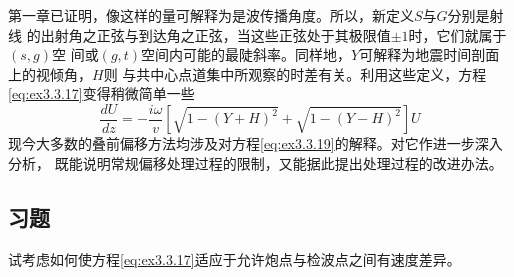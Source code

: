 第一章已证明，像这样的量可解释为是波传播角度。所以，新定义$S$与$G$分别是射线
的出射角之正弦与到达角之正弦，当这些正弦处于其极限值$±1$时，它们就属于$(s,g)$空
间或$(g,t)$空间内可能的最陡斜率。同样地，$Y$可解释为地震时间剖面上的视倾角，$H$则
与共中心点道集中所观察的时差有关。利用这些定义，方程\ref{eq:ex3.3.17}变得稍微简单一些
\begin{equation}
\frac{dU}{dz}=-\frac{i\omega}{v}[\sqrt{1-(Y+H)^2}+\sqrt{1-(Y-H)^2}]U
\label{eq:ex3.3.19}
\end{equation}
现今大多数的叠前偏移方法均涉及对方程\ref{eq:ex3.3.19}的解释。对它作进一步深入分析，
既能说明常规偏移处理过程的限制，又能据此提出处理过程的改进办法。

\subsection{习题}
\label{sec:3.3.6}
试考虑如何使方程\ref{eq:ex3.3.17}适应于允许炮点与检波点之间有速度差异。

